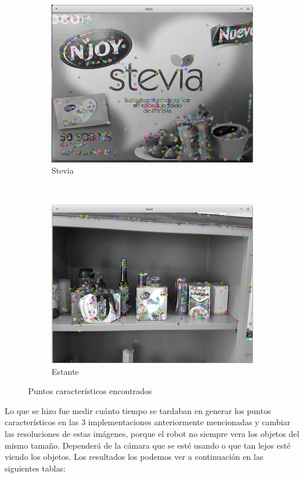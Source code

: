\begin{figure}[H]
    \begin{subfigure}[b]{0.35\textwidth}
        \includegraphics[width=\textwidth]{img/stevia.png}
        \caption{Stevia}
    \end{subfigure}
    ~ %
      \begin{subfigure}[b]{0.35\textwidth}
        \includegraphics[width=\textwidth]{img/estante.png}
        \caption{Estante}
    \end{subfigure}
    \caption{Puntos característicos encontrados}
\end{figure}
Lo que se hizo fue medir cuánto tiempo se tardaban en generar los puntos característicos en las 3 implementaciones anteriormente mencionadas y cambiar las resoluciones de estas imágenes, porque el robot no siempre vera los objetos del mismo tamaño. Dependerá de la cámara que se esté usando o que tan lejos esté viendo los objetos. Los resultados los podemos ver a continuación en las siguientes tablas:
